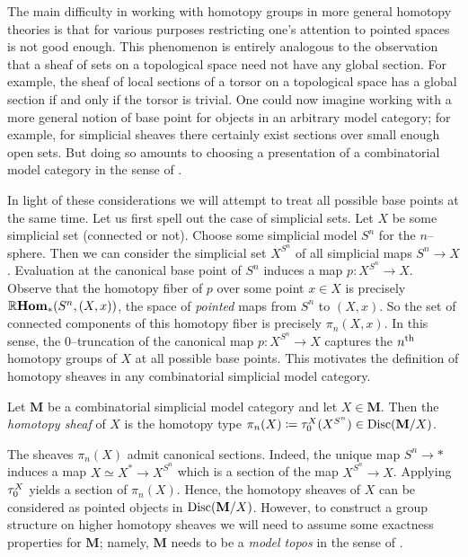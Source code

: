 The main difficulty in working with homotopy groups in more general
homotopy theories is that for various purposes restricting one's
attention to pointed spaces is not good enough. This phenomenon is
entirely analogous to the observation that a sheaf of sets on a
topological space need not have any global section. For example, the
sheaf of local sections of a torsor on a topological space has a
global section if and only if the torsor is trivial. One could now
imagine working with a more general notion of base point for objects in
an arbitrary model category; for example, for simplicial sheaves there
certainly exist sections over small enough open sets. But doing so
amounts to choosing a presentation of a combinatorial model category
in the sense of \cite{mr1870516}.

In light of these considerations we will attempt to treat all possible
base points at the same time. Let us first spell out the case of
simplicial sets. Let \(X\) be some simplicial set (connected or
not). Choose some simplicial model \(S^{n}\) for the
\(n\)--sphere. Then we can consider the simplicial set \(X^{S^{n}}\)
of all simplicial maps \(S^{n}\to X\). Evaluation at the canonical
base point of \(S^{n}\) induces a map \(p\colon X^{S^{n}}\to
X\). Observe that the homotopy fiber of \(p\) over some point \(x\in
X\) is precisely \(\operatorname{\mathbb{R}\textnormal{\bfseries Hom}}_{*}(S^{n}, (X,x))\), the space of
\emph{pointed} maps from \(S^{n}\) to \((X,x)\). So the set of
connected components of this homotopy fiber is precisely
\(\pi_{n}(X,x)\). In this sense, the \(0\)--truncation of the
canonical map \(p\colon X^{S^{n}}\to X\) captures the
\(n\textsuperscript{th}\) homotopy groups of \(X\) at all possible
base points. This motivates the definition of homotopy sheaves in any
combinatorial simplicial model category.

\begin{definition}
  Let \(\mathbf M\) be a combinatorial simplicial model category and
  let \(X\in\mathbf M\). Then the \emph{
    homotopy sheaf} of \(X\) is the homotopy type
  \(\pi_{n}(X)\coloneqq\tau_{0}^{X}(X^{S^{n}})\in\operatorname{\textnormal{Disc}}(\mathbf
  M/X)\).
\end{definition}

The sheaves \(\pi_{n}(X)\) admit canonical sections. Indeed, the
unique map \(S^{n}\to *\) induces a map \(X\simeq X^{*}\to X^{S^{n}}\)
which is a section of the map \(X^{S^{n}}\to X\). Applying
\(\tau_{0}^{X}\) yields a section of \(\pi_{n}(X)\). Hence, the
homotopy sheaves of \(X\) can be considered as pointed objects in
\(\operatorname{\textnormal{Disc}}(\mathbf M/X)\). However, to construct a group structure on
higher homotopy sheaves we will need to assume some exactness
properties for \(\mathbf M\); namely, \(\mathbf M\) needs to be a
\emph{model topos} in the sense of \cite{rezkhomotopytoposes}.

